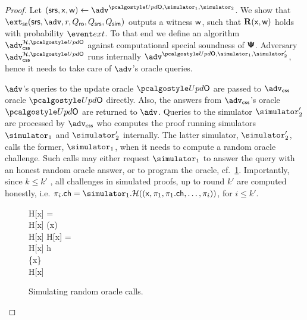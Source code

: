\begin{proof}	
	Let $(\srs, \inp, \wit) \gets \advse^{\initU, \simulator_1, \simulator_2}$. We show that $\extse (\srs, \advse, r, \Qro, \Qsrs, \Qsim)$ outputs a witness $\mathsf{w}$, such that $\mathbf{R}(\mathsf{x}, \mathsf{w})$ holds with probability $\extProb$. To that end we define an algorithm $\advcss^{\ro, \initU}$ against computational special soundness of $\bm{\mathsf{\Psi}}$.
%
	Adversary $\advcss^{\ro, \initU}$ runs internally $\advse^{\initU, \simulator_1, \simulator'_2}$, hence it needs to take care of $\advse$'s oracle queries. %

	$\advse$'s queries to the update oracle $\initU$ are passed to $\advcss$ oracle $\initU$ directly. Also, the answers from $\advcss$'s oracle $\initU$ are returned to $\advse$.
	Queries to the simulator $\simulator'_2$ are processed by $\advcss$ who computes the proof running simulators $\simulator_1$ and $\simulator'_2$ internally. The latter simulator, $\simulator'_{2}$, calls the former,  $\simulator_{1}$, when it needs to compute a random oracle challenge. Such calls may either request $\simulator_{1}$ to answer the query with an honest random oracle answer, or to program the oracle, cf.~\cref{fig:simulator_oracles}. Importantly, since $k \leq k'$ , all challenges in simulated proofs, up to round $k'$ are computed honestly, i.e. $\zkproof_{i}.\ch = \simulator_{1}.\ro((\inp, \zkproof_1, \zkproof_1.\ch, \ldots, \zkproof_{i}))$, for $i \leq k'$.
	\begin{figure}
		\centering
			\begin{pcvstack}
			\begin{pchstack}
				{
				\pcif H[x] = \bot \pcthen \\
				\pcind H[x] \gets \ro(x) \\
				\pcreturn H[x]
		  		}
				\pchspace
				{ 
					\pcif H[x] = \bot \pcthen \\ 
					\pcind H[x] \gets h \\
					\pcind \Qprog \gets \Qprog \cup \{x\}\\
					\pcreturn H[x]
				}
			\end{pchstack}
		\end{pcvstack}
		\caption{Simulating random oracle calls.}
		\label{fig:simulator_oracles}
	\end{figure}	


\end{proof}
